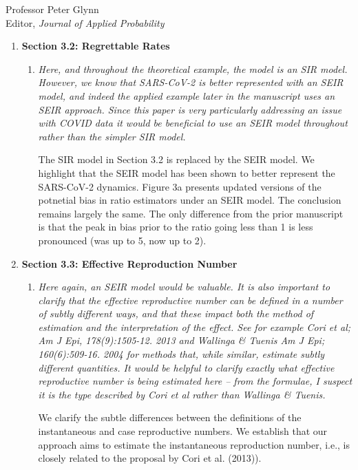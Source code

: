 \documentclass[11pt]{letter} %
\begin{document}
\begin{letter}{Professor
	Peter Glynn\\
	Editor, {\em Journal of Applied Probability}}
\begin{enumerate}
\begin{enumerate}
	We clarify that increasing testing capacity may impact FP and FN rates if altering changes the sample collection quality, e.g., a testing center switches from nasal swab to oropharyngeal swabs or saliva specimen to increase testing capacity will change measurement error due to the different test characteristic.
\end{enumerate}
\item {\bf Section 3.2: Regrettable Rates}
\begin{enumerate}
	\item {\it Here, and throughout the theoretical example, the model is an SIR model. However, we know that SARS-CoV-2 is better represented with an SEIR model, and indeed the applied example later in the manuscript uses an SEIR approach. Since this paper is very particularly addressing an issue with COVID data it would be beneficial to use an SEIR model throughout rather than the simpler SIR model.}
	\vspace{5mm}

	The SIR model in Section 3.2 is replaced by the SEIR model.  We highlight that the SEIR model has been shown to better represent the SARS-CoV-2 dynamics.  Figure 3a presents updated versions of the potnetial bias in ratio estimators under an SEIR model.   The conclusion remains largely the same. The only difference from the prior manuscript is that the peak in bias prior to the ratio going less than 1 is less pronounced (was up to 5, now up to 2).
	\vspace{5mm}
\end{enumerate}
\item {\bf Section 3.3: Effective Reproduction Number}
\begin{enumerate}
	\item {\it Here again, an SEIR model would be valuable. It is also important to clarify that the effective reproductive number can be defined in a number of subtly different ways, and that these impact both the method of estimation and the interpretation of the effect. See for example Cori et al; Am J Epi, 178(9):1505-12. 2013 and Wallinga \& Tuenis Am J Epi; 160(6):509-16. 2004 for methods that, while similar, estimate subtly different quantities. It would be helpful to clarify exactly what effective reproductive number is being estimated here – from the formulae, I suspect it is the type described by Cori et al rather than Wallinga \& Tuenis.}
	\vspace{5mm}

	We clarify the subtle differences between the definitions of the instantaneous and case reproductive numbers.  We establish that our approach aims to estimate the instantaneous reproduction number, i.e., is closely related to the proposal by Cori et al. (2013)).


\end{enumerate}
\end{enumerate}
\end{letter}
\end{document}
